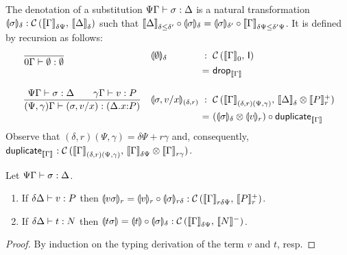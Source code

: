 \documentclass[acmsmall,review,anonymous]{acmart}\settopmatter{printfolios=true,printccs=false,printacmref=false}
\begin{document}
The denotation of a substitution $\SubstTy \Psi \Gamma \sigma \Delta$
is a natural transformation
$\denv \sigma \delta : \Hom {\Den \Gamma {\delta\Psi}} {\Den \Delta
  \delta}$
such that
$
\Den \Delta {\delta \leq \delta'}
\comp
\denv \sigma \delta
=
\denv \sigma {\delta'}
\comp
\Den \Gamma {\delta\Psi \leq \delta'\Psi}
$.
It is defined by recursion as follows:
\[
\begin{array}{ll@{~}c@{~}l@{~}c@{~}l}
\ru{
    }{\SubstTy {0} \Gamma \sempty \cempty}
& \denv \sempty \delta
& : & \Hom {\Den\Gamma 0} \I
\\ &
& = & \tdrop[\den\Gamma]
\\[3ex]
\ru{\SubstTy \Psi \Gamma \sigma \Delta \qquad
      \qValTy \gamma \Gamma v P
    }{\pSubstTy {\Psi,\gamma} \Gamma {\sext \sigma x v} {\ext \Delta x P}}
& \denvp {\sext \sigma x v} {\delta,r}
& : & \Hom  {\Den\Gamma{(\delta,r)(\Psi,\gamma)}} {\Den \Delta \delta \otimes \Denp P r}
\\ &
& = & (\denv \sigma \delta \otimes \denv v r)
\comp \duplicate[\den\Gamma]
\end{array}
\]
Observe that $(\delta,r)(\Psi,\gamma) = \delta\Psi + r\gamma$ and,
consequently,
$\duplicate[\den\Gamma] : \Hom {\Den\Gamma{(\delta,r)(\Psi,\gamma)}}
{\Den\Gamma{\delta\Psi} \otimes \Den\Gamma{r\gamma}}$.
\begin{theorem}
  Let $\SubstTy \Psi \Gamma \sigma \Delta$.
  \begin{enumerate}
  \item If $\qValTy \delta \Delta v P$ then
     $\denv{v\sigma}r = \denv v {r} \comp \denv \sigma {r\delta}
      : \Hom {\Den{\Gamma}{r\delta\Psi}} {\Denp P r}$.
  \item If $\qCompTy \delta \Delta t N$ then
     $\dent{t\sigma} = \dent t \comp \denv \sigma \delta
      : \Hom {\Den\Gamma{\delta\Psi}} {\denn N}$.
  \end{enumerate}
\end{theorem}
\begin{proof}
  By induction on the typing derivation of the term $v$ and $t$, resp.
\end{proof}
\end{document}
